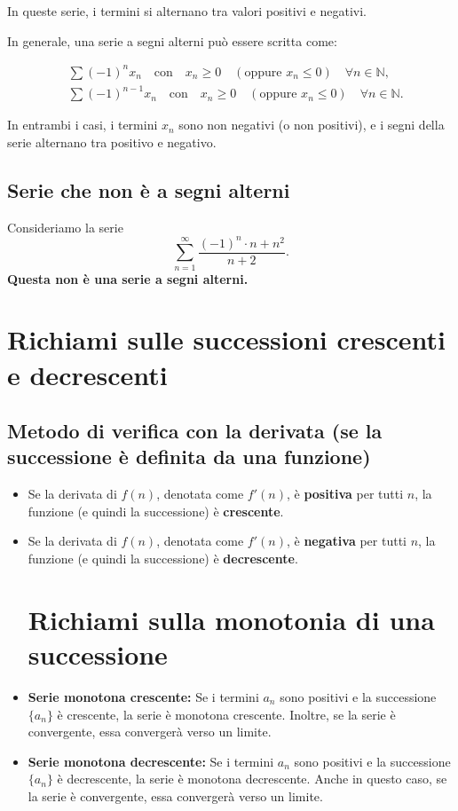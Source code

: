 \documentclass{article}
\begin{document}
In queste serie, i termini si alternano tra valori positivi e negativi.

In generale, una serie a segni alterni può essere scritta come:

\begin{align*}
    & \sum (-1)^n x_n \quad \text{con} \quad x_n \geq 0 \quad (\text{oppure } x_n \leq 0) \quad \forall n \in \mathbb{N}, \\
    & \sum (-1)^{n-1} x_n \quad \text{con} \quad x_n \geq 0 \quad (\text{oppure } x_n \leq 0) \quad \forall n \in \mathbb{N}.
\end{align*}

In entrambi i casi, i termini $x_n$ sono non negativi (o non positivi), e i segni della serie alternano tra positivo e negativo.

\subsection*{Serie che non è a segni alterni}
Consideriamo la serie
\[
    \sum_{n=1}^\infty \frac{(-1)^n \cdot n + n^2}{n+2}.
\]
\textbf{Questa non è una serie a segni alterni. }

\section{Richiami  sulle successioni crescenti e decrescenti}

\subsection*{Metodo di verifica con la derivata (se la successione è definita da una funzione)}
\begin{itemize}
    \item Se la derivata di $f(n)$, denotata come $f'(n)$, è \textbf{positiva} per tutti $n$, la funzione (e quindi la successione) è \textbf{crescente}.
    \item Se la derivata di $f(n)$, denotata come $f'(n)$, è \textbf{negativa} per tutti $n$, la funzione (e quindi la successione) è \textbf{decrescente}.
\section*{Richiami sulla monotonia di una successione}
\end{itemize}

\begin{itemize}
    \item \textbf{Serie monotona crescente:} Se i termini \( a_n \) sono positivi e la successione \( \{a_n\} \) è crescente, la serie è monotona crescente. Inoltre, se la serie è convergente, essa convergerà verso un limite.
    \item \textbf{Serie monotona decrescente:} Se i termini \( a_n \) sono positivi e la successione \( \{a_n\} \) è decrescente, la serie è monotona decrescente. Anche in questo caso, se la serie è convergente, essa convergerà verso un limite.
\end{itemize}
\end{document}
